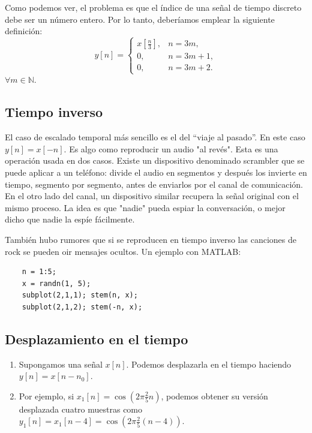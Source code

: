 \begin{enumerate}
	Como podemos ver, el problema es que el índice de una señal
	de tiempo discreto debe ser un número entero. Por lo tanto,
	deberíamos emplear la siguiente definición:
	\begin{equation}
		y[n] = 
		\begin{cases}
			x\left[\frac{n}{3}\right], & n = 3m, \\
			0, & n = 3m + 1, \\
			0, & n = 3m + 2.
		\end{cases}
	\end{equation}
	$\forall m \in \mathbb{N}$.
	
\end{enumerate}

\subsection{Tiempo inverso}

El caso de escalado temporal más sencillo es el del ``viaje al
pasado''. En este caso $y[n] = x[-n]$. Es algo como reproducir un audio "al revés".
Esta es una operación usada en dos casos. Existe un dispositivo denominado scrambler que se puede aplicar a un teléfono: divide el audio en segmentos y después los invierte en tiempo, segmento por segmento, antes de enviarlos por el canal de comunicación. En el otro lado del canal, un dispositivo similar recupera la señal original con el mismo proceso. La idea es que "nadie" pueda espiar la conversación, o mejor dicho que nadie la espíe fácilmente.

También hubo rumores que si se reproducen en tiempo inverso las canciones de rock se pueden oir mensajes ocultos. Un ejemplo con MATLAB:
\begin{verbatim}
	n = 1:5;
	x = randn(1, 5);
	subplot(2,1,1); stem(n, x); 
	subplot(2,1,2); stem(-n, x);
\end{verbatim}

\subsection{Desplazamiento en el tiempo}

\begin{enumerate}
	\item Supongamos una señal $x[n]$. Podemos desplazarla en el tiempo
	haciendo $y[n] = x[n - n_{0}]$.
	\item Por ejemplo, si $x_{1}[n] = \cos(2\pi \frac{2}{5} n)$,
	podemos obtener su versión desplazada cuatro muestras como
	$y_{1}[n] = x_{1}[n - 4] = \cos(2\pi \frac{2}{5} (n - 4))$.
\end{enumerate}

